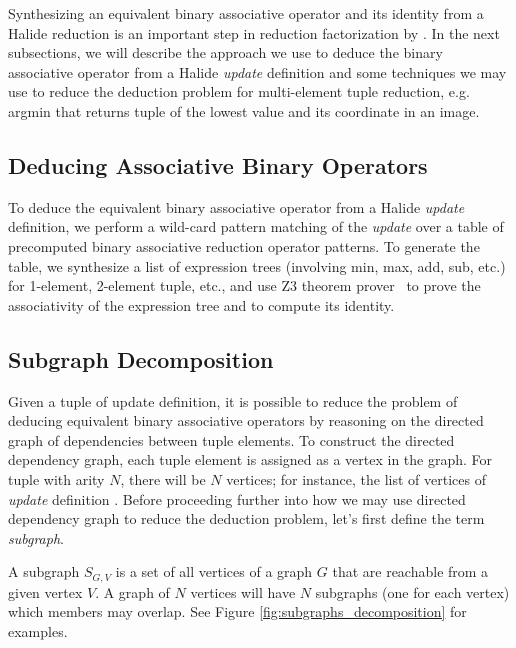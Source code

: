 Synthesizing an equivalent binary associative operator and its identity from a Halide reduction is an important step in reduction factorization by . In the next subsections, we will describe the approach we use to deduce the binary associative operator from a Halide \emph{update} definition and some techniques we may use to reduce the deduction problem for multi-element tuple reduction, e.g. argmin that returns tuple of the lowest value and its coordinate in an image.

\subsection{Deducing Associative Binary Operators}

To deduce the equivalent binary associative operator from a Halide \emph{update} definition, we perform a wild-card pattern matching of the \emph{update} over a table of precomputed binary associative reduction operator patterns. To generate the table, we synthesize a list of expression trees (involving min, max, add, sub, etc.) for 1-element, 2-element tuple, etc., and use Z3 theorem prover~\cite{DeMoura:2008:ZES:1792734.1792766} to prove the associativity of the expression tree and to compute its identity. \\

\subsection{Subgraph Decomposition}

Given a tuple of update definition, it is possible to reduce the problem of deducing equivalent binary associative operators by reasoning on the directed graph of dependencies between tuple elements. To construct the directed dependency graph, each tuple element is assigned as a vertex in the graph. For tuple with arity $N$, there will be $N$ vertices; for instance, the list of vertices of \emph{update} definition . Before proceeding further into how we may use directed dependency graph to reduce the deduction problem, let's first define the term \emph{subgraph}. 

\begin{definition}
A subgraph $S_{G,V}$ is a set of all vertices of a graph $G$ that are reachable from a given vertex $V$. A graph of $N$ vertices will have $N$ subgraphs (one for each vertex) which members may overlap. See Figure \ref{fig:subgraphs_decomposition} for examples. 
\end{definition}

